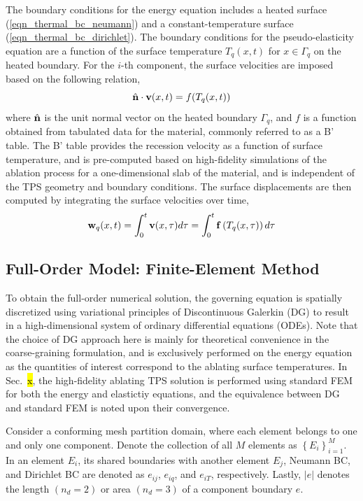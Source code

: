 The boundary conditions for the energy equation includes a heated surface (\cref{eqn_thermal_bc_neumann}) and a constant-temperature surface (\cref{eqn_thermal_bc_dirichlet}). The boundary conditions for the pseudo-elasticity equation are a function of the surface temperature $T_q(x,t)$ for $x\in\Gamma_q$ on the heated boundary. For the $i$-th component, the surface velocities are imposed based on the following relation,
\begin{equation}
    \hat{{\mathbf{n}}}\cdot\mathbf{v}(x,t) = f(T_q(x,t))\label{eqn_boundary_velocity}
\end{equation}
where $\hat{{\mathbf{n}}}$ is the unit normal vector on the heated boundary $\Gamma_q$, and $f$ is a function obtained from tabulated data for the material, commonly referred to as a B' table. The B' table provides the recession velocity as a function of surface temperature, and is pre-computed based on high-fidelity simulations of the ablation process for a one-dimensional slab of the material, and is independent of the TPS geometry and boundary conditions. The surface displacements are then computed by integrating the surface velocities over time,
\begin{equation}
    \mathbf{w}_q(x,t) = \int_{0}^{t} \mathbf{v}(x,\tau)d\tau = \int_{0}^{t}\mathbf{f}\left(T_q(x,\tau)\right)d\tau\label{eqn_boundary_displacement}
\end{equation}

\subsection{Full-Order Model: Finite-Element Method}\label{sec_fom}

To obtain the full-order numerical solution, the governing equation is spatially discretized using variational principles of Discontinuous Galerkin (DG) to result in a high-dimensional system of ordinary differential equations (ODEs). Note that the choice of DG approach here is mainly for theoretical convenience in the coarse-graining formulation, and is exclusively performed on the energy equation as the quantities of interest correspond to the ablating surface temperatures. In Sec.~\hl{x}, the high-fidelity ablating TPS solution is performed using standard FEM for both the energy and elastictiy equations, and the equivalence between DG and standard FEM is noted upon their convergence.

Consider a conforming mesh partition domain, where each element belongs to one and only one component. Denote the collection of all $M$ elements as $\left\{E_i\right\}_{i=1}^{M}$. In an element $E_i$, its shared boundaries with another element $E_j$, Neumann BC, and Dirichlet BC are denoted as $e_{ij}$, $e_{iq}$, and $e_{iT}$, respectively. Lastly, $\left|e\right|$ denotes the length $(n_d=2)$ or area $(n_d=3)$ of a component boundary $e$.

